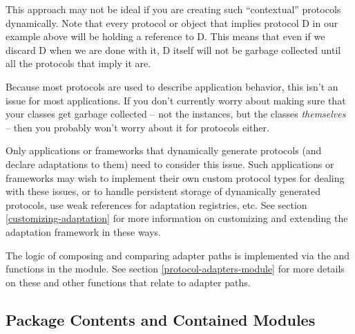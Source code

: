 \begin{verbatim%
}
\begin{verbatim%
}
\begin{verbatim%
}
\begin{verbatim%
}
This approach may not be ideal if you are creating such ``contextual''
protocols dynamically.  Note that every protocol or object that implies
protocol D in our example above will be holding a reference to D.  This means
that even if we discard D when we are done with it, D itself will not be
garbage collected until all the protocols that imply it are.

Because most protocols are used to describe application behavior, this isn't an
issue for most applications.  If you don't currently worry about making sure
that your classes get garbage collected  -- not the instances, but the classes
\emph{themselves} -- then you probably won't worry about it for protocols
either.

Only applications or frameworks that dynamically generate protocols (and
declare adaptations to them) need to consider this issue. Such applications or
frameworks may wish to implement their own custom protocol types for dealing
with these issues, or to handle persistent storage of dynamically generated
protocols, use weak references for adaptation registries, etc.  See section
\ref{customizing-adaptation} for more information on customizing and extending
the adaptation framework in these ways.





\begin{seealso}

The logic of composing and comparing adapter paths is implemented via the
 and  functions in the
 module.  See section \ref{protocol-adapters-module}
for more details on these and other functions that relate to adapter paths.


\end{seealso}
































\subsection{Package Contents and Contained Modules\label{protocols-contents}}


\end{verbatim%
}
\end{verbatim%
}
\end{verbatim%
}
\end{verbatim%
}
